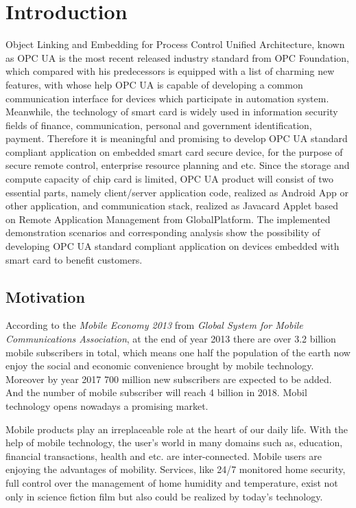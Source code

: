 \chapter{Introduction}\label{secIntroduction}

Object Linking and Embedding for Process Control Unified Architecture, known as OPC UA is the most recent released industry standard from OPC Foundation, which compared with his predecessors is equipped with a list of charming new features, with whose help OPC UA is capable of developing a common communication interface for devices which participate in automation system. Meanwhile, the technology of smart card is widely used in information security fields of finance, communication, personal and government identification, payment. Therefore it is meaningful and promising to develop OPC UA standard compliant application on embedded smart card secure device, for the purpose of secure remote control, enterprise resource planning and etc. Since the storage and compute capacity of chip card is limited, OPC UA product will consist of two essential parts, namely client/server application code, realized as Android App or other application, and communication stack, realized as Javacard Applet based on Remote Application Management from GlobalPlatform. The implemented demonstration scenarios and corresponding analysis show the possibility of developing OPC UA standard compliant application on devices embedded with smart card to benefit customers. 

\section{Motivation}\label{secMotivation}

According to the \emph{Mobile Economy 2013} from \emph{Global System for Mobile Communications Association}, at the end of year 2013 there are over 3.2 billion mobile   subscribers in total, which means one half the population of the earth now enjoy the social and economic convenience brought by mobile technology. Moreover by year 2017 700 million new subscribers are expected to be added. And the number of mobile subscriber will reach 4 billion in 2018. Mobil technology opens nowadays a promising market. 

Mobile products  play an irreplaceable role at the heart of our  daily life. With the help of mobile technology, the user's world in many domains such as, education, financial transactions, health and etc. are inter-connected. Mobile users are enjoying the advantages of mobility. Services, like 24/7 monitored home security, full control over the management of home humidity and temperature, exist not only in science fiction film but also could be realized by today's technology.

